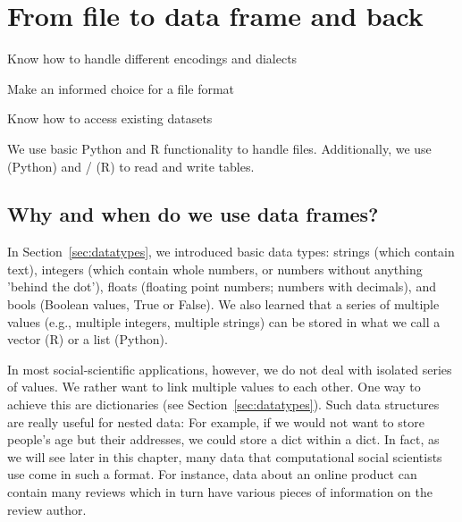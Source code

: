 \chapter{From file to data frame and back}
\label{chap:filetodata}


\begin{abstract}{Abstract}
  This chapter teaches you basics of file handling, such as different file formats and encodings. It introduces csv files, json files, plain text files, and binary file formats. We discuss different approaches to organizing data in files, and how to write data frames to and read them from these files].  Finally, we provide guidance for retrieving example datasets.
\end{abstract}


\begin{objectives}
\item Know how to handle different encodings and dialects
\item Make an informed choice for a file format
\item Know how to access existing datasets
\end{objectives}

\begin{feature}
We use basic Python and R functionality to handle files. Additionally, we use  (Python) and / (R) to read and write tables.
\end{feature}


\section{Why and when do we use data frames?}

In Section~\ref{sec:datatypes}, we introduced basic data types: strings (which contain text), integers (which contain whole numbers, or numbers without anything 'behind the dot'), floats (floating point numbers; numbers with decimals), and bools (Boolean values, True or False). 
We also learned that a series of multiple values (e.g., multiple integers, multiple strings) can be stored in what we call a vector (R) or a list (Python).

In most social-scientific applications, however, we do not deal with isolated series of values. We rather want to link multiple values to each other. One way to achieve this are dictionaries (see Section~\ref{sec:datatypes}).
Such data structures are really useful for nested data:
For example, if we would not want to store people's age but their addresses,
we could store a dict within a dict.
In fact, as we will see later in this chapter, many data that computational social scientists use come in such a format.
For instance, data about an online product can contain many reviews which in turn have various pieces of information on the review author.

